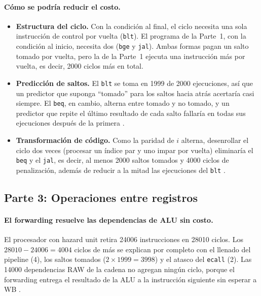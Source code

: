 \documentclass[11pt,a4paper]{article}
\begin{document}
\paragraph{C\'omo se podr\'ia reducir el costo.}
\begin{itemize}
  \item \textbf{Estructura del ciclo.} Con la condici\'on al final, el ciclo
        necesita una sola instrucci\'on de control por vuelta (\texttt{blt}).
        El programa de la Parte~1, con la condici\'on al inicio, necesita dos
        (\texttt{bge} y \texttt{jal}). Ambas formas pagan un salto tomado por
        vuelta, pero la de la Parte~1 ejecuta una instrucci\'on m\'as por
        vuelta, es decir, 2000 ciclos m\'as en total.
  \item \textbf{Predicci\'on de saltos.} El \texttt{blt} se toma en 1999 de
        2000 ejecuciones, as\'i que un predictor que suponga ``tomado'' para
        los saltos hacia atr\'as acertar\'ia casi siempre. El \texttt{beq}, en
        cambio, alterna entre tomado y no tomado, y un predictor que repite
        el \'ultimo resultado de cada salto fallar\'ia en todas sus
        ejecuciones despu\'es de la primera \cite{smith}.
  \item \textbf{Transformaci\'on de c\'odigo.} Como la paridad de $i$
        alterna, desenrollar el ciclo dos veces (procesar un \'indice par y uno
        impar por vuelta) eliminar\'ia el \texttt{beq} y el \texttt{jal}, es
        decir, al menos 2000 saltos tomados y 4000 ciclos de penalizaci\'on,
        adem\'as de reducir a la mitad las ejecuciones del \texttt{blt}
        \cite{patterson}.
\end{itemize}

\subsection{Parte 3: Operaciones entre registros}

\paragraph{El forwarding resuelve las dependencias de ALU sin costo.}
El procesador con hazard unit retira 24006 instrucciones en 28010 ciclos. Los
$28010 - 24006 = 4004$ ciclos de m\'as se explican por completo con el llenado del
pipeline (4), los saltos tomados ($2 \times 1999 = 3998$) y el atasco del
\texttt{ecall} (2). Las 14000 dependencias RAW de la cadena no agregan ning\'un
ciclo, porque el forwarding entrega el resultado de la ALU a la instrucci\'on
siguiente sin esperar a WB \cite{harris,patterson}.
\end{document}
